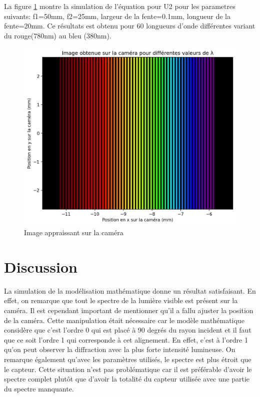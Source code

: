 \documentclass[conference]{IEEEtran}
\begin{document}
 La figure \ref{arc-en-ciel} montre la simulation de l'équation pour U2 pour les parametres suivants: 
 f1=50mm, f2=25mm, largeur de la fente=0.1mm, longueur de la fente=20mm. Ce résultats est obtenu pour
 60 longueurs d'onde différentes variant du rouge(780nm) au bleu (380nm). 
 \begin{figure}[H]
    \centering
    \includegraphics[scale=0.5]{simulation.png}
    \caption{Image appraissant sur la caméra}
    \label{arc-en-ciel}
\end{figure}


\section{Discussion}
La simulation de la modélisation mathématique donne un résultat satisfaisant. En effet, on remarque que tout le spectre
de la lumière visible est présent sur la caméra. Il est cependant important de mentionner qu'il a fallu ajuster la
position de la caméra. Cette manipulation était nécessaire car le modèle mathématique considère que c'est l'ordre 0 qui est placé à 90 degrés du rayon
incident et il faut que ce soit l'ordre 1 qui corresponde à cet alignement. En effet, c'est à l'ordre 1 qu'on peut observer
la diffraction avec la plus forte intensité lumineuse. On remarque également qu'avec les paramètres utilisés, le spectre est plus étroit
que le capteur. Cette situation n'est pas problématique car il est préférable d'avoir le spectre complet plutôt que d'avoir la totalité du capteur utilisée
avec une partie du spectre manquante.
\end{document}
